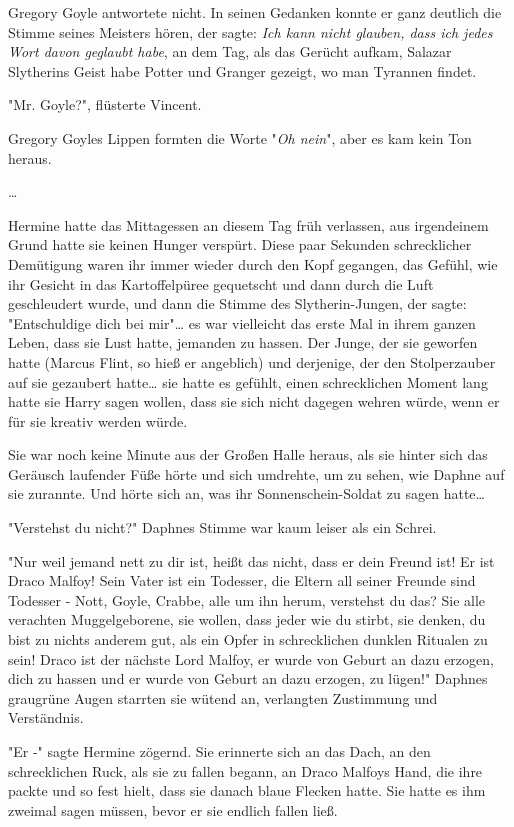 {Gregory Goyle antwortete nicht. In seinen Gedanken konnte er ganz deutlich die Stimme seines Meisters hören, der sagte: \emph{Ich kann nicht glauben, dass ich jedes Wort davon geglaubt habe}, an dem Tag, als das Gerücht aufkam, Salazar Slytherins Geist habe Potter und Granger gezeigt, wo man Tyrannen findet.

"Mr. Goyle?", flüsterte Vincent.

Gregory Goyles Lippen formten die Worte "\emph{Oh nein}", aber es kam kein Ton heraus.

…

Hermine hatte das Mittagessen an diesem Tag früh verlassen, aus irgendeinem Grund hatte sie keinen Hunger verspürt. Diese paar Sekunden schrecklicher Demütigung waren ihr immer wieder durch den Kopf gegangen, das Gefühl, wie ihr Gesicht in das Kartoffelpüree gequetscht und dann durch die Luft geschleudert wurde, und dann die Stimme des Slytherin-Jungen, der sagte: "Entschuldige dich bei mir"… es war vielleicht das erste Mal in ihrem ganzen Leben, dass sie Lust hatte, jemanden zu hassen. Der Junge, der sie geworfen hatte (Marcus Flint, so hieß er angeblich) und derjenige, der den Stolperzauber auf sie gezaubert hatte… sie hatte es gefühlt, einen schrecklichen Moment lang hatte sie Harry sagen wollen, dass sie sich nicht dagegen wehren würde, wenn er für sie kreativ werden würde.

Sie war noch keine Minute aus der Großen Halle heraus, als sie hinter sich das Geräusch laufender Füße hörte und sich umdrehte, um zu sehen, wie Daphne auf sie zurannte. Und hörte sich an, was ihr Sonnenschein-Soldat zu sagen hatte…

"Verstehst du nicht?" Daphnes Stimme war kaum leiser als ein Schrei.

"Nur weil jemand nett zu dir ist, heißt das nicht, dass er dein Freund ist! Er ist Draco Malfoy! Sein Vater ist ein Todesser, die Eltern all seiner Freunde sind Todesser - Nott, Goyle, Crabbe, alle um ihn herum, verstehst du das? Sie alle verachten Muggelgeborene, sie wollen, dass jeder wie du stirbt, sie denken, du bist zu nichts anderem gut, als ein Opfer in schrecklichen dunklen Ritualen zu sein! Draco ist der nächste Lord Malfoy, er wurde von Geburt an dazu erzogen, dich zu hassen und er wurde von Geburt an dazu erzogen, zu lügen!" Daphnes graugrüne Augen starrten sie wütend an, verlangten Zustimmung und Verständnis.

"Er -" sagte Hermine zögernd. Sie erinnerte sich an das Dach, an den schrecklichen Ruck, als sie zu fallen begann, an Draco Malfoys Hand, die ihre packte und so fest hielt, dass sie danach blaue Flecken hatte. Sie hatte es ihm zweimal sagen müssen, bevor er sie endlich fallen ließ.

}
